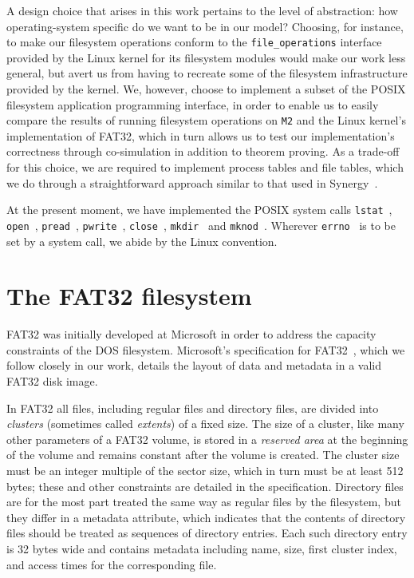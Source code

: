 \documentclass[submission,copyright,creativecommons]{eptcs}
\begin{document}
A design choice that arises in this work pertains to the level of
abstraction: how operating-system specific do we want to be in our
model? Choosing, for instance, to make our filesystem operations
conform to the \texttt{file\_operations} interface~\cite{lkmpgchap4}
provided by the
Linux kernel for its filesystem modules would make our work less
general, but avert us from having to recreate some of the filesystem
infrastructure provided by the kernel. We, however, choose to
implement a subset of the POSIX filesystem application
programming interface, in order to enable us to easily compare the
results of running filesystem operations on \texttt{M2} and the Linux
kernel's implementation of FAT32, which in turn allows us to test our
implementation's correctness through co-simulation in addition to
theorem proving. As a trade-off for this choice, we are required to
implement process tables and file tables, which we do through a
straightforward approach similar to that used in
Synergy~\cite{bevier1996executable}.

At the present moment, we have implemented the POSIX system calls
\texttt{lstat}~\cite{kerrisklstat}, \texttt{open}~\cite{kerriskopen},
\texttt{pread}~\cite{kerriskpread},
\texttt{pwrite}~\cite{kerriskpwrite},
\texttt{close}~\cite{kerriskclose},
\texttt{mkdir}~\cite{kerriskmkdir} and
\texttt{mknod}~\cite{kerriskmknod}. Wherever
\texttt{errno}~\cite{kerriskerrno} is to be
set by a system call, we abide by the Linux convention.

\section{The FAT32 filesystem}
\label{sec:fat32fs}

FAT32 was initially developed at Microsoft in order to address the
capacity constraints of the DOS filesystem. Microsoft's specification
for FAT32~\cite{microsoft2000}, which we follow closely in our work,
details the layout of data and metadata in a valid FAT32 disk image.

In FAT32 all files, including regular files and directory files, are
divided into \textit{clusters} (sometimes called \textit{extents}) of
a fixed size. The size of a cluster, like many other parameters
of a FAT32 volume, is stored in a \textit{reserved area} at the
beginning of the volume and remains constant after the volume is
created. The cluster size must be an integer multiple of the sector
size, which in turn must be at least 512 bytes; these and other
constraints are detailed in the specification. Directory
files are for the most part treated the same way as regular files by
the filesystem, but they differ in a metadata attribute, which
indicates that the contents of directory files should be treated as
sequences of directory entries. Each such directory entry is
32 bytes wide and contains metadata including name, size, first
cluster index, and access times for the corresponding file.
\end{document}
